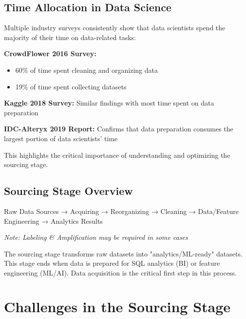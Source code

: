 \documentclass[12pt]{article}
\begin{document}
\subsection{Time Allocation in Data Science}
\begin{tcolorbox}[colback=gray!10!white,colframe=gray!50!black,title=Research Findings]
Multiple industry surveys consistently show that data scientists spend the majority of their time on data-related tasks:

\textbf{CrowdFlower 2016 Survey:}
\begin{itemize}
    \item 60\% of time spent cleaning and organizing data
    \item 19\% of time spent collecting datasets
\end{itemize}

\textbf{Kaggle 2018 Survey:} Similar findings with most time spent on data preparation

\textbf{IDC-Alteryx 2019 Report:} Confirms that data preparation consumes the largest portion of data scientists' time

This highlights the critical importance of understanding and optimizing the sourcing stage.
\end{tcolorbox}

\subsection{Sourcing Stage Overview}
\begin{tcolorbox}[colback=green!5!white,colframe=green!75!black,title=Sourcing Process Flow]
Raw Data Sources → Acquiring → Reorganizing → Cleaning → Data/Feature Engineering → Analytics Results

\textit{Note: Labeling \& Amplification may be required in some cases}
\end{tcolorbox}

\begin{tcolorbox}[colback=yellow!5!white,colframe=yellow!75!black,title=Key Insight]
The sourcing stage transforms raw datasets into "analytics/ML-ready" datasets. This stage ends when data is prepared for SQL analytics (BI) or feature engineering (ML/AI). Data acquisition is the critical first step in this process.
\end{tcolorbox}

\section{Challenges in the Sourcing Stage}
\end{document}
